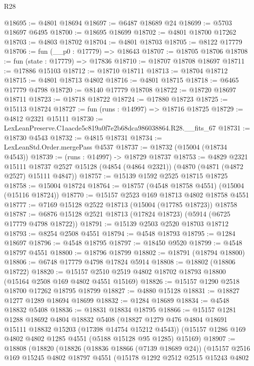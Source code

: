\begin{lexlean}{R28}
\begin{coremodule}
@18695 := @4801 @18694
@18697 := @6487 @18689 @24
@18699 := @5703 @18697 @6495
@18700 := @18695 @18699
@18702 := @4801 @18700 @17262
@18703 := @4803 @18702
@18704 := @4801 @18703
@18705 := @8122 @17779
@18706 := fun (__p0 : @17779) => @18643
@18707 := @18705 @18706
@18708 := fun (state : @17779) => @17836
@18710 := @18707 @18708 @18697
@18711 := @17886 @15103
@18712 := @18710 @18711
@18713 := @18704 @18712
@18715 := @4801 @18713 @4802
@18716 := @4801 @18715
@18718 := @6465 @17779 @4798
@18720 := @8140 @17779 @18708
@18722 := @18720 @18697 @18711
@18723 := @18718 @18722
@18724 := @17880 @18723
@18725 := @15113 @18724
@18727 := fun (runs : @14997) => @18716 @18725
@18729 := @4812 @2321 @15111
@18730 := LexLeanPreserve.C1aacde5c819a0f7e2b68dca986038864.R28.__fits_67
@18731 := @18730 @4543
@18732 := @4815 @18731
@18734 := LexLeanStd.Order.mergePass @4537
@18737 := @18732 (@15004 (@18734 @4543))
@18739 := (runs : @14997) -> @18729 @18737
@18753 := @4829
    @2321
    @15111
    @18737
    @2527
    @15128
    (@4854 (@4864 @2321))
    (@4870 (@4871 (@4872 @2527) @15111 @4847))
@18757 := @15139 @1592 @2525 @18715 @18725
@18758 := @15004 @18724
@18764 := @18757 (@4548 @18758 @4551) (@15004 (@15116 @18724))
@18770 := @15157 @2523 @169 @18713 @4802 @18758 @4551
@18777 := @7169 @15128 @2522 @18713 (@15004 (@17785 @18723)) @18758
@18787 := @6876 @15128 @2521 @18713 (@17824 @18723) (@5914 (@6725 @17779 @4798 @18722))
@18791 := @15139 @2503 @2520 @18703 @18712
@18793 := @8254 @2508 @4551
@18794 := @4548 @18793
@18795 := @1284 @18697
@18796 := @4548 @18795
@18797 := @18450 @9520
@18799 := @4548 @18797 @4551
@18800 := @18796 @18799
@18802 := @18791 (@18794 @18800)
@18806 := @6748 @17779 @4798 @17824 @5914
@18808 := @18802 (@18806 @18722)
@18820 := @15157 @2510 @2519 @4802 @18702 @18793 @18800 (@15164 @2508 @169 @4802 @4551 @15169)
@18826 := @15157 @1290 @2518 @18700 @17262 @18795 @18799
@18827 := @4880 @15128
@18831 := @18827 @1277 @1289 @18694 @18699
@18832 := @1284 @18689
@18834 := @4548 @18832 @5408
@18836 := @18831 @18834 @18795
@18866 := @15157
    @1281
    @1288
    @18692
    @4804
    @18832
    @5408
    (@18827 @1279 @476 @4804 @18691 @15111 @18832 @15203 (@17398 @14754 @15212 @4543))
    (@15157 @1286 @169 @4802 @4802 @1285 @4551 (@5188 @15128 @95 @1285) @15169)
@18907 := @18808
    (@18820
      (@18826
        (@18836 @18866 (@7139 @18689 @24))
        (@15157
          @2516
          @169
          @15245
          @4802
          @18797
          @4551
          (@15178
            @1292
            @2512
            @2515
            @15243
            @4802

\end{coremodule}
\end{lexlean}
